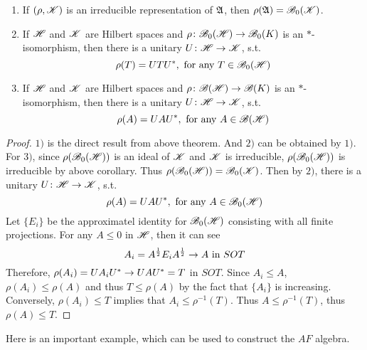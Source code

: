 \begin{cor} \label{cor10}
	\begin{enumerate}[label=\arabic*)]
		\item If $(\rho, \mathscr{K})$ is an irreducible representation of $\mathfrak{A}$, then $\rho(\mathfrak{A}) = \mathscr{B}_0(\mathscr{K})$.
		\item If $\mathscr{H}$ and $\mathscr{K}$ are Hilbert spaces and $\rho \colon \mathscr{B}_{0}\mathscr{(H)} \rightarrow \mathscr{B}_0(K)$ is an $*$-isomorphism, then there is a unitary $U \colon \mathscr{H} \rightarrow \mathscr{K}$, s.t.
		\begin{equation*}
			\rho(T) = U T U^{*}, \text{ for any } T \in \mathscr{B}_{0}\mathscr{(H)}
		\end{equation*}
		\item If $\mathscr{H}$ and $\mathscr{K}$ are Hilbert spaces and $\rho \colon \mathscr{B(H)} \rightarrow \mathscr{B}(K)$ is an $*$-isomorphism, then there is a unitary $U \colon \mathscr{H} \rightarrow \mathscr{K}$, s.t.
		\begin{equation*}
			\rho(A) = U A U^{*}, \text{ for any } A \in \mathscr{B(H)}
		\end{equation*}
	\end{enumerate}
\end{cor}
\begin{proof}
	$1)$ is the direct result from above theorem. And $2)$ can be obtained by $1)$. \\
	For $3)$, since $\rho(\mathscr{B}_{0}\mathscr{(H)})$ is an ideal of $\mathscr{K}$ and $\mathscr{K}$ is irreducible, $\rho(\mathscr{B}_{0}\mathscr{(H)})$ is irreducible by above corollary. Thus $\rho(\mathscr{B}_{0}\mathscr{(H)}) = \mathscr{B}_0(\mathscr{K})$. Then by $2)$, there is a unitary $U \colon \mathscr{H} \rightarrow \mathscr{K}$, s.t.
	\begin{equation*}
		\rho(A) = U A U^{*}, \text{ for any } A \in \mathscr{B}_{0}\mathscr{(H)}
	\end{equation*}
	Let $\{E_i\}$ be the approximatel identity for $\mathscr{B}_{0}\mathscr{(H)}$ consisting with all finite projections. For any $A \leqslant 0$ in $\mathscr{H}$, then it can see
	\begin{equation*}
		A_i = A^{\frac{1}{2}} E_i A^{\frac{1}{2}} \rightarrow A \text{ in } SOT
	\end{equation*}
	Therefore, $\rho(A_i) = U A_i U^{*} \rightarrow U A U^{*} = T$ in $SOT$. Since $A_i \leqslant A$, $\rho(A_i) \leqslant \rho(A)$ and thus $T \leqslant \rho(A)$ by the fact that $\{A_i\}$ is increasing. Conversely, $\rho(A_i) \leqslant T$ implies that $A_i \leqslant \rho^{-1}(T)$. Thus $A \leqslant \rho^{-1}(T)$, thus $\rho(A) \leqslant T$.
\end{proof}

Here is an important example, which can be used to construct the $AF$ algebra.

